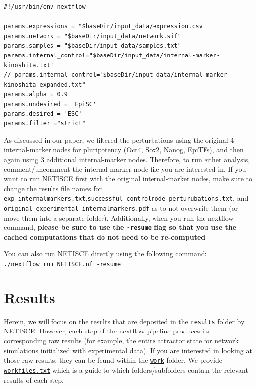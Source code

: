 \documentclass[
]{book}
\begin{document}
\begin{verbatim}
#!/usr/bin/env nextflow

params.expressions = "$baseDir/input_data/expression.csv"
params.network = "$baseDir/input_data/network.sif"
params.samples = "$baseDir/input_data/samples.txt"
params.internal_control="$baseDir/input_data/internal-marker-kinoshita.txt"
// params.internal_control="$baseDir/input_data/internal-marker-kinoshita-expanded.txt"
params.alpha = 0.9
params.undesired = 'EpiSC'
params.desired = 'ESC'
params.filter ="strict"
\end{verbatim}

As discussed in our paper, we filtered the perturbations using the original 4 internal-marker nodes for pluripotency (Oct4, Sox2, Nanog, EpiTFs), and then again using 3 additional internal-marker nodes. Therefore, to run either analysis, comment/uncomment the internal-marker node file you are interested in. If you want to run NETISCE first with the original internal-marker nodes, make sure to change the results file names for \texttt{exp\_internalmarkers.txt},\texttt{successful\_controlnode\_perturubations.txt}, and \texttt{original-experimental\_internalmarkers.pdf} as to not overwrite them (or move them into a separate folder). Additionally, when you run the nextflow command, \textbf{please be sure to use the \texttt{-resume} flag so that you use the cached computations that do not need to be re-computed}

You can also run NETISCE directly using the following command: \texttt{./nextflow\ run\ NETISCE.nf\ -resume}

\hypertarget{results-1}{%
\section{Results}\label{results-1}}

Herein, we will focus on the results that are deposited in the \href{https://github.com/VeraLiconaResearchGroup/Netisce/tree/main/ipsc_validation/results}{\texttt{results}} folder by NETISCE. However, each step of the nextflow pipeline produces its corresponding raw results (for example, the entire attractor state for network simulations initialized with experimental data). If you are interested in looking at those raw results, they can be found within the \href{https://github.com/VeraLiconaResearchGroup/Netisce/tree/main/ipsc_validation/work}{\texttt{work}} folder. We provide \href{https://github.com/VeraLiconaResearchGroup/Netisce/blob/main/ipsc_validation/workfiles.txt}{\texttt{workfiles.txt}} which is a guide to which folders/subfolders contain the relevant results of each step.
\end{document}
